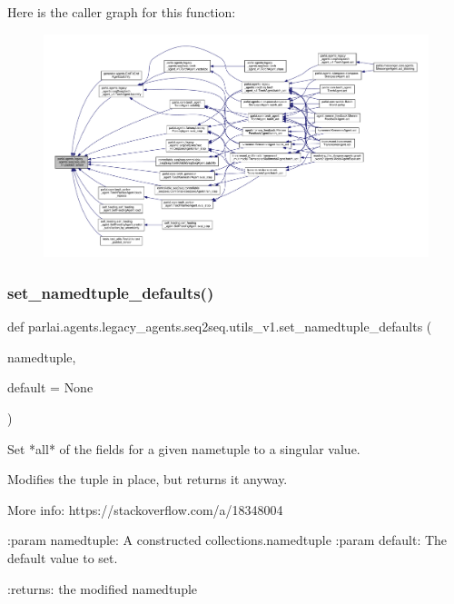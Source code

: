 Here is the caller graph for this function\+:
\nopagebreak
\begin{figure}[H]
\begin{center}
\leavevmode
\includegraphics[width=350pt]{namespaceparlai_1_1agents_1_1legacy__agents_1_1seq2seq_1_1utils__v1_adb5a414ae439f14c54e8c760b91cc4c8_icgraph}
\end{center}
\end{figure}
\mbox{\label{namespaceparlai_1_1agents_1_1legacy__agents_1_1seq2seq_1_1utils__v1_a17553492abb2e671bc3fc58e1e3a96b0}} 
\subsubsection{\texorpdfstring{set\+\_\+namedtuple\+\_\+defaults()}{set\_namedtuple\_defaults()}}
{\footnotesize\ttfamily def parlai.\+agents.\+legacy\+\_\+agents.\+seq2seq.\+utils\+\_\+v1.\+set\+\_\+namedtuple\+\_\+defaults (\begin{DoxyParamCaption}\item[{}]{namedtuple,  }\item[{}]{default = {\ttfamily None} }\end{DoxyParamCaption})}

\begin{DoxyVerb}Set *all* of the fields for a given nametuple to a singular value.

Modifies the tuple in place, but returns it anyway.

More info:
https://stackoverflow.com/a/18348004

:param namedtuple: A constructed collections.namedtuple
:param default: The default value to set.

:returns: the modified namedtuple
\end{DoxyVerb}
 

